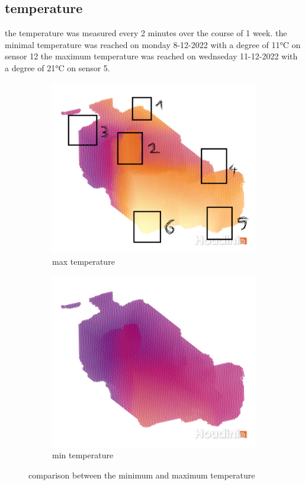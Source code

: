 \subsection{temperature} 
the temperature was measured every 2 minutes over the course of 1 week. the minimal temperature was reached on monday 8-12-2022 with a degree of 11°C on sensor 12 the maximum temperature was reached on wednseday 11-12-2022 with a degree of 21°C on sensor 5.\\ 
\begin{figure}[hbt!] 
   \begin{subfigure}{0.5\textwidth} 
        \includegraphics[width=0.99\linewidth]{reports/current_report/images/max_temperature.png}  
        \caption{max temperature}  
    \end{subfigure} 
    \begin{subfigure}{0.5\textwidth} 
       \includegraphics[width=0.99\linewidth]{reports/current_report/images/min_temperature.png}  
       \caption{min temperature}  
    \end{subfigure} 
\caption{comparison between the minimum and maximum  temperature}  
\end{figure} 
